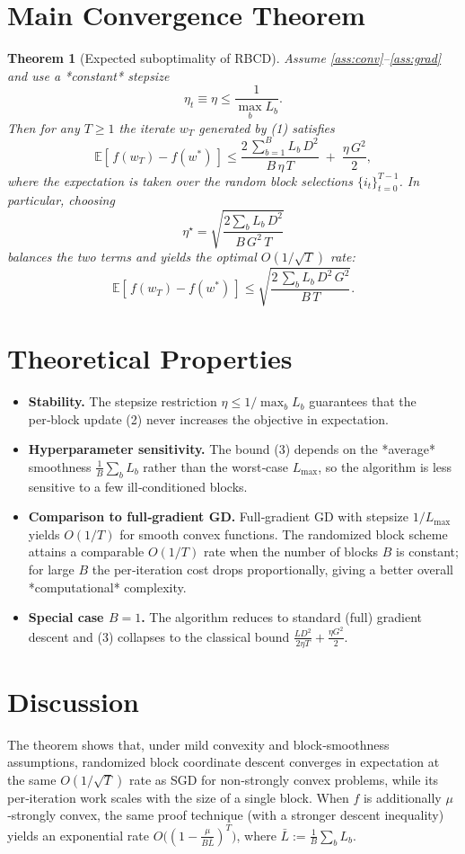 \documentclass{article}
\newtheorem{theorem}{Theorem}
\newcommand{\E}{\mathbb{E}}
\begin{document}
\section*{Main Convergence Theorem}
\begin{theorem}[Expected suboptimality of RBCD]\label{thm:main}
Assume \ref{ass:conv}–\ref{ass:grad} and use a *constant* stepsize
\[
\eta_{t}\equiv \eta \le \frac{1}{\max_{b}L_{b}} .
\]
Then for any $T\ge 1$ the iterate $w_{T}$ generated by (1) satisfies
\[
\E\!\left[\,f(w_{T})-f(w^{*})\,\right]
\le
\frac{2\,\sum_{b=1}^{B}L_{b}\,D^{2}}{B\,\eta\,T}
\;+\;
\frac{\eta\,G^{2}}{2},
\tag{3}
\]
where the expectation is taken over the random block selections $\{i_{t}\}_{t=0}^{T-1}$.
In particular, choosing
\[
\eta^{\star}= \sqrt{\frac{2\sum_{b}L_{b}\,D^{2}}{B\,G^{2}\,T}}
\]
balances the two terms and yields the optimal $O(1/\sqrt{T})$ rate:
\[
\E\!\left[\,f(w_{T})-f(w^{*})\,\right]\le
\sqrt{\frac{2\,\sum_{b}L_{b}\,D^{2}\,G^{2}}{B\,T}} .
\tag{4}
\]
\end{theorem}

\section*{Theoretical Properties}
\begin{itemize}
\item \textbf{Stability.} The stepsize restriction $\eta\le 1/\max_{b}L_{b}$ guarantees that the per‑block update (2) never increases the objective in expectation.
\item \textbf{Hyperparameter sensitivity.} The bound (3) depends on the *average* smoothness $\frac{1}{B}\sum_{b}L_{b}$ rather than the worst‑case $L_{\max}$, so the algorithm is less sensitive to a few ill‑conditioned blocks.
\item \textbf{Comparison to full‑gradient GD.} Full‑gradient GD with stepsize $1/L_{\max}$ yields $O(1/T)$ for smooth convex functions. The randomized block scheme attains a comparable $O(1/T)$ rate when the number of blocks $B$ is constant; for large $B$ the per‑iteration cost drops proportionally, giving a better overall *computational* complexity.
\item \textbf{Special case $B=1$.} The algorithm reduces to standard (full) gradient descent and (3) collapses to the classical bound $\frac{L D^{2}}{2\eta T}+\frac{\eta G^{2}}{2}$.
\end{itemize}

\section*{Discussion}
The theorem shows that, under mild convexity and block‑smoothness assumptions, randomized block coordinate descent converges in expectation at the same $O(1/\sqrt{T})$ rate as SGD for non‑strongly convex problems, while its per‑iteration work scales with the size of a single block. When $f$ is additionally $\mu$‑strongly convex, the same proof technique (with a stronger descent inequality) yields an exponential rate $O\!\big((1-\frac{\mu}{B\bar L})^{T}\big)$, where $\bar L:=\frac{1}{B}\sum_{b}L_{b}$.
\end{document}
